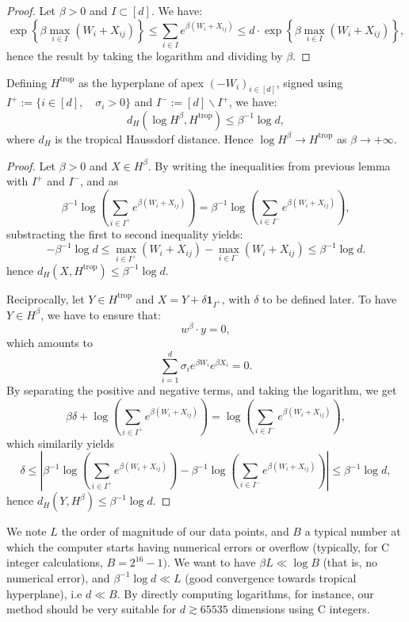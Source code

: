 \begin{proof}
Let $\beta>0$ and $I\subset[d]$. We have: 
\[
\exp\left\{ \beta\max_{i\in I}\left(W_{i}+X_{ij}\right)\right\} \le\sum_{i\in I}e^{\beta(W_{i}+X_{ij})}\le d\cdot\exp\left\{ \beta\max_{i\in I}\left(W_{i}+X_{ij}\right)\right\} ,
\]
hence the result by taking the logarithm and dividing by $\beta$. 
\end{proof}
\begin{prop} 

Defining $H^{\text{trop}}$ as the hyperplane of apex $(-W_{i})_{i\in[d]}$,
signed using $I^{+}:=\{i\in[d],\quad\sigma_{i}>0\}$ and $I^{-}:=[d]\backslash I^{+}$,
we have: 
\[
d_{H}\left(\log H^{\beta},H^{\text{trop}}\right)\le\beta^{-1}\log d,
\]
where $d_{H}$ is the tropical Haussdorf distance. Hence $\log H^{\beta}\longrightarrow H^{\text{trop}}$
as $\beta\longrightarrow+\infty$. 
\end{prop}

\begin{proof}
Let $\beta>0$ and $X\in H^{\beta}$. By writing the inequalities
from previous lemma with $I^{+}$ and $I^{-}$, and as $$\beta^{-1}\log\left(\sum_{i\in I^{+}}e^{\beta(W_{i}+X_{ij})}\right)=\beta^{-1}\log\left(\sum_{i\in I^{-}}e^{\beta(W_{i}+X_{ij})}\right),$$
substracting the first to second inequality yields: 
\[
-\beta^{-1}\log d\le\max_{i\in I^{+}}(W_{i}+X_{ij})-\max_{i\in I^{-}}(W_{i}+X_{ij})\le\beta^{-1}\log d.
\]
hence $d_H(X,H^{\text{trop}})\le\beta^{-1}\log d$.

Reciprocally, let $Y\in H^{\text{trop}}$ and $X=Y+\delta\mathbf{1}_{I^{+}}$,
with $\delta$ to be defined later. To have $Y\in H^{\beta}$, we
have to ensure that: 
\[
w^{\beta}\cdot y=0,
\]
which amounts to 
\[
\sum_{i=1}^d\sigma_{i}e^{\beta W_{i}}e^{\beta X_{i}}=0.
\]
By separating the positive and negative terms, and taking the logarithm,
we get 
\[
\beta\delta+\log\left(\sum_{i\in I^{+}}e^{\beta(W_{i}+X_{ij})}\right)=\log\left(\sum_{i\in I^{-}}e^{\beta(W_{i}+X_{ij})}\right),
\]
which similarily yields 
\[
\delta\le\left|\beta^{-1}\log\left(\sum_{i\in I^{+}}e^{\beta(W_{i}+X_{ij})}\right)-\beta^{-1}\log\left(\sum_{i\in I^{-}}e^{\beta(W_{i}+X_{ij})}\right)\right|\le\beta^{-1}\log d,
\]
hence $d_H(Y,H^{\beta})\le\beta^{-1}\log d$. 
\end{proof}
\begin{rem}
We note $L$ the order of magnitude of our data points, and $B$ a
typical number at which the computer starts having numerical errors
or overflow (typically, for C integer calculations, $B=2^{16}-1)$.
We want to have $\beta L\ll\log B$ (that is, no numerical error),
and $\beta^{-1}\log d\ll L$ (good convergence towards tropical hyperplane),
i.e $d\ll B$. By directly computing logarithms, for instance, our
method should be very suitable for $d\apprge65535$ dimensions using
C integers. 
\end{rem}


